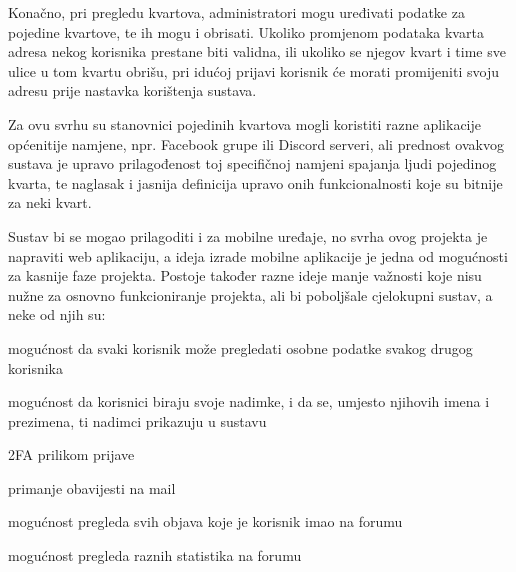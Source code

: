 	Konačno, pri pregledu kvartova, administratori mogu uređivati podatke za pojedine kvartove, te ih mogu i obrisati. Ukoliko promjenom podataka kvarta adresa nekog korisnika prestane biti validna, ili ukoliko se njegov kvart i time sve ulice u tom kvartu obrišu, pri idućoj prijavi korisnik će morati promijeniti svoju adresu prije nastavka korištenja sustava.
	
	Za ovu svrhu su stanovnici pojedinih kvartova mogli koristiti razne aplikacije općenitije namjene, npr. Facebook grupe ili Discord serveri, ali prednost ovakvog sustava je upravo prilagođenost toj specifičnoj namjeni spajanja ljudi pojedinog kvarta, te naglasak i jasnija definicija upravo onih funkcionalnosti koje su bitnije za neki kvart.
	
	Sustav bi se mogao prilagoditi i za mobilne uređaje, no svrha ovog projekta je napraviti web aplikaciju, a ideja izrade mobilne aplikacije je jedna od mogućnosti za kasnije faze projekta. Postoje također razne ideje manje važnosti koje nisu nužne za osnovno funkcioniranje projekta, ali bi poboljšale cjelokupni sustav, a neke od njih su:
	
	\begin{packed_item}
		\item 	mogućnost da svaki korisnik može pregledati osobne podatke svakog drugog korisnika
		\item	mogućnost da korisnici biraju svoje nadimke, i da se, umjesto njihovih imena i prezimena, ti nadimci prikazuju u sustavu
		\item 	2FA prilikom prijave
		\item 	primanje obavijesti na mail
		\item 	mogućnost pregleda svih objava koje je korisnik imao na forumu
		\item	mogućnost pregleda raznih statistika na forumu
		
	\end{packed_item}
